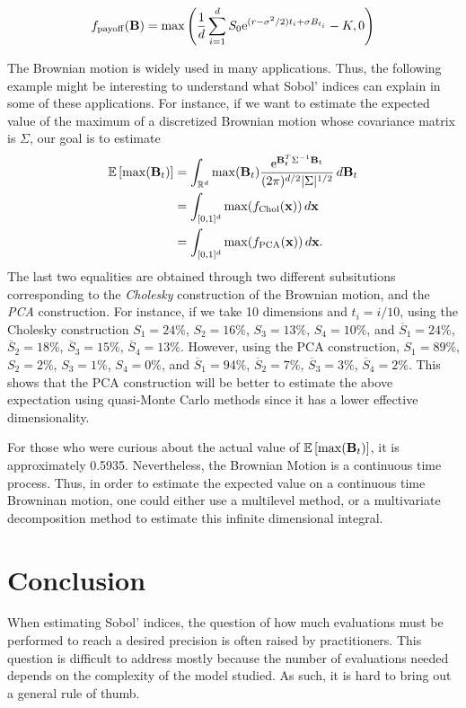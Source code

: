 \[
f_{\rm payoff}(\boldsymbol{\mathbf{B}}) = \max\left(\frac{1}{d}\sum_{i=1}^d S_0\text{e}^{(r-\sigma^2/2)t_i+\sigma B_{t_i}}-K, 0\right)
\]

The Brownian motion is widely used in many applications. Thus, the following example might be interesting to understand what Sobol' indices can explain in some of these applications. For instance, if we want to estimate the expected value of the maximum of a discretized Brownian motion whose covariance matrix is $\Sigma$, our goal is to estimate
\begin{align*}
\mathbb{E} \left[\max(\boldsymbol{\mathbf{B}}_t)\right] &= \int_{\mathbb{R}^d} \max(\boldsymbol{\mathbf{B}}_t) \frac{{\rm e}^{\boldsymbol{\mathbf{B}}_t^T\Sigma^{-1}\boldsymbol{\mathbf{B}}_t}}{(2\pi)^{d/2}|\Sigma|^{1/2}}\,d\boldsymbol{\mathbf{B}}_t \\
&= \int_{[0,1]^d} \max(f_{\rm Chol}(\boldsymbol{\mathbf{x}})) \,d\boldsymbol{\mathbf{x}} \\
&= \int_{[0,1]^d} \max(f_{\rm PCA}(\boldsymbol{\mathbf{x}})) \,d\boldsymbol{\mathbf{x}}.
\end{align*}
The last two equalities are obtained through two different subsitutions corresponding to the \textit{Cholesky} construction of the Brownian motion, and the \textit{PCA} construction. For instance, if we take 10 dimensions and $t_i=i/10$, using the Cholesky construction $S_{1} = 24\%$, $S_{2} = 16\%$, $S_{3} = 13\%$, $S_{4} = 10\%$, and $\overline{S}_{1}=24\%$, $\overline{S}_{2}=18\%$, $\overline{S}_{3}=15\%$, $\overline{S}_{4} = 13\%$. However, using the PCA construction, $S_{1} = 89\%$, $S_{2} = 2\%$, $S_{3} = 1\%$, $S_{4} = 0\%$, and $\overline{S}_{1}=94\%$, $\overline{S}_{2}=7\%$, $\overline{S}_{3}=3\%$, $\overline{S}_{4} = 2\%$. This shows that the PCA construction will be better to estimate the above expectation using quasi-Monte Carlo methods since it has a lower effective dimensionality.

For those who were curious about the actual value of $\mathbb{E} \left[\max(\boldsymbol{\mathbf{B}}_t)\right]$, it is approximately 0.5935. Nevertheless, the Brownian Motion is a continuous time process. Thus, in order to estimate the expected value on a continuous time Browninan motion, one could either use a multilevel method, or a multivariate decomposition method to estimate this infinite dimensional integral.


\section{Conclusion}
When estimating Sobol' indices, the question of how much evaluations must be performed to reach a desired precision is often raised by practitioners. This question is difficult to address mostly because the number of evaluations needed depends on the complexity of the model studied. As such, it is hard to bring out a general rule of thumb. 

